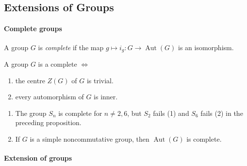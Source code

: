 \subsection{Extensions of Groups}

\paragraph{Complete groups}

\begin{definition}
  A group \( G \) is \emph{complete} if the map \( g \mapsto i_g: G \to \operatorname{Aut}(G) \) is an isomorphism.
\end{definition}

\begin{proposition}
  A group \( G \) is a complete \( \iff \)
  \begin{enumerate}
    \item the centre \( Z(G) \) of \( G \) is trivial.
    \item every automorphism of \( G \) is inner.
  \end{enumerate}
\end{proposition}

\begin{example}
  \begin{enumerate}
    \item The group \( S_n \) is complete for \( n \neq 2, 6 \), but \( S_2 \) fails (1) and \( S_6 \) fails (2) in the preceding proposition.
    \item If \( G \) is a simple noncommutative group, then \( \operatorname{Aut}(G) \) is complete.
  \end{enumerate}
\end{example}


\paragraph{Extension of groups}

